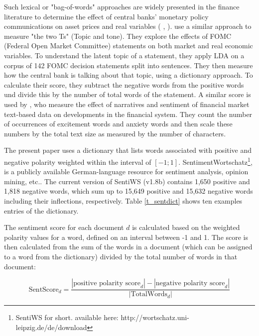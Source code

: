 \documentclass[12pt,a4paper,notitlepage]{article}
\begin{document}
Such lexical or "bag-of-words" approaches are widely presented in the finance literature to determine the effect of central banks' monetary policy communications on asset prices and real variables (\citet{nyman_news_2018} \citet{tetlock_giving_2007}, \citet{tetlock_more_2008}). \citet{hansen_shocking_2016} use a similar approach to measure "the two Ts" (Topic and tone). They explore the effects of FOMC (Federal Open Market Committee) statements on both market and real economic variables. To understand the latent topic of a statement, they apply LDA on a corpus of 142 FOMC decision statements split into sentences. They then measure how the central bank is talking about that topic, using a dictionary approach. To calculate their score, they subtract the negative words from the positive words und divide this by the number of total words of the statement. A similar score is used by \citet{nyman_news_2018}, who measure the effect of narratives and sentiment of financial market text-based data on developments in the financial system. They count the number of occurrences of excitement words and anxiety words and then scale these numbers by the total text size as measured by the number of characters.

The present paper uses a dictionary that lists words associated with positive and negative polarity weighted within the interval of $[-1; 1]$. SentimentWortschatz\footnote{SentiWS for short. available here: http://wortschatz.uni-leipzig.de/de/download}, is a publicly available German-language resource for sentiment analysis, opinion mining, etc.. The current version of SentiWS (v1.8b) contains 1,650 positive and 1,818 negative words, which sum up to 15,649 positive and 15,632 negative words including their inflections, respectively. Table \ref{t_sentdict} shows ten examples entries of the dictionary.



The sentiment score for each document $d$ is calculated  based on the weighted polarity values for a word, defined on an interval between -1 and 1. The score is then calculated from the sum of the words in a document (which can be assigned to a word from the dictionary) divided by the total number of words in that document:
 
\begin{equation}
	\text{SentScore}_d = \frac{|\text{positive polarity score}_d| - |\text{negative polarity score}_d|}{|\text{TotalWords}_d|}
\end{equation}
\end{document}
